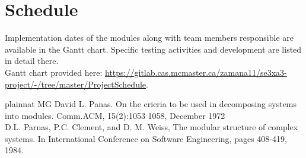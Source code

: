 \documentclass[12pt, titlepage]{article}
\begin{document}
\newpage
\section{Schedule}
Implementation dates of the modules along with team members responsible are available in the Gantt chart. Specific testing activities and development are listed in detail there.\\

Gantt chart provided here: \href{https://gitlab.cas.mcmaster.ca/zamana11/se3xa3-project/-/tree/master/ProjectSchedule)}{https://gitlab.cas.mcmaster.ca/zamana11/se3xa3-project/-/tree/master/ProjectSchedule}.


 {plainnat}
 {MG}
David L. Panas. On the crieria to be used in decomposing systems into modules. Comm.ACM, 15(2):1053 1058, December 1972\\

D.L. Parnas, P.C. Clement, and D. M. Weiss, The modular structure of complex systems. In International Conference on Software Engineering, pages 408-419, 1984.
\end{document}
